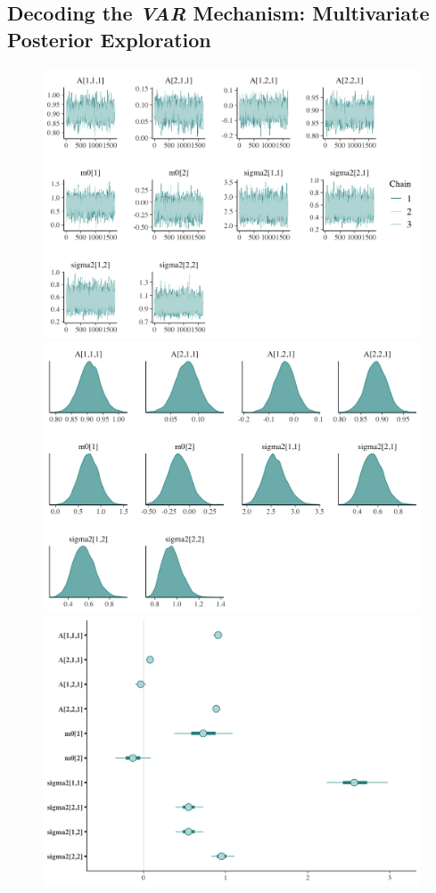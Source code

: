 \documentclass{Configuration_Files/PoliMi3i_thesis}
\begin{document}
\subsection{Decoding the \textbf{\textit{VAR}} Mechanism: Multivariate Posterior Exploration}
\begin{figure}[H]
    \centering
    \includegraphics[width=0.62\linewidth]{VAR-trace.png}
    \vspace{0.5em}
    
    \includegraphics[width=0.62\linewidth]{VAR-density.png}
    \vspace{0.5em}
    
    \includegraphics[width=0.62\linewidth]{VAR-interval.png}
\end{figure}
\end{document}
